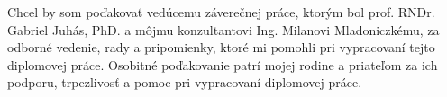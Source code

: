 Chcel by som poďakovať vedúcemu záverečnej práce, ktorým bol prof. RNDr. Gabriel Juhás, PhD. a môjmu konzultantovi Ing. Milanovi Mladoniczkému, za odborné vedenie, rady a pripomienky, ktoré mi pomohli pri vypracovaní tejto diplomovej práce. Osobitné poďakovanie patrí mojej rodine a priateľom za ich podporu, trpezlivosť a pomoc pri vypracovaní diplomovej práce.